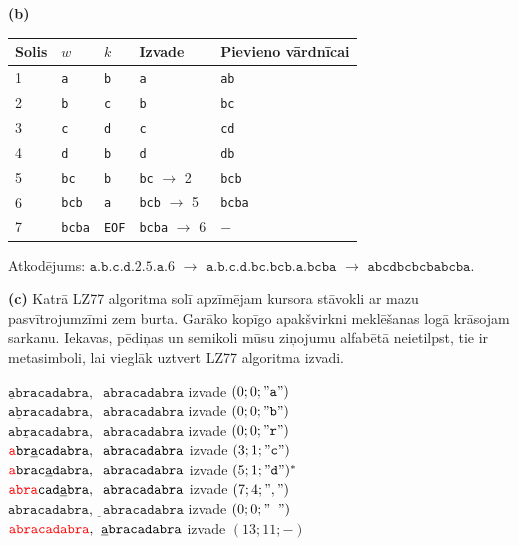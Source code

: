 \documentclass[a4paper,12pt]{article}
\begin{document}
{{\bf (b)}

\begin{center}
\begin{tabular}{ |l|l|l|l|l| } \hline
Solis & $w$ & $k$ & Izvade & Pievieno vārdnīcai \\ \hline
1 & {\tt a} & {\tt b} & {\tt a} & {\tt ab} \\
2 & {\tt b} & {\tt c} & {\tt b} & {\tt bc} \\ 
3 & {\tt c} & {\tt d} & {\tt c} & {\tt cd} \\ 
4 & {\tt d} & {\tt b} & {\tt d} & {\tt db} \\ 
5 & {\tt bc} & {\tt b} & {\tt bc} $\rightarrow$ 2 & {\tt bcb} \\ 
6 & {\tt bcb} & {\tt a} & {\tt bcb} $\rightarrow$ 5 & {\tt bcba} \\ 
7 & {\tt bcba} & {\tt EOF} & {\tt bcba} $\rightarrow$ 6 & $-$ \\ \hline
\end{tabular}
\end{center}

Atkodējums: $\mathtt{a.b.c.d.2.5.a.6}$ $\rightarrow$ $\mathtt{a.b.c.d.bc.bcb.a.bcba}$ $\rightarrow$ 
$\mathtt{abcdbcbcbabcba}$.



{\bf (c)} Katrā LZ77 algoritma solī apzīmējam kursora stāvokli ar mazu pasvītrojumzīmi zem burta.
Garāko kopīgo apakšvirkni meklēšanas logā krāsojam sarkanu.
Iekavas, pēdiņas un semikoli mūsu ziņojumu alfabētā neietilpst, tie ir metasimboli, lai 
vieglāk uztvert LZ77 algoritma izvadi.

\noindent
$\underline{\mathtt{a}}\mathtt{bracadabra,\;\;abracadabra}$ \textendash{} izvade $(0;0;\mathtt{"a"})$\\
$\mathtt{a}\underline{\mathtt{b}}\mathtt{racadabra,\;\;abracadabra}$ \textendash{} izvade $(0;0;\mathtt{"b"})$\\
$\mathtt{ab}\underline{\mathtt{r}}\mathtt{acadabra,\;\;abracadabra}$ \textendash{} izvade $(0;0;\mathtt{"r"})$\\
$\mathtt{\textcolor{red}{a}br}\underline{\mathtt{a}}\mathtt{cadabra,\;\;abracadabra}$ \textendash{} izvade $(3;1;\mathtt{"c"})$\\
$\mathtt{\textcolor{red}{a}brac}\underline{\mathtt{a}}\mathtt{dabra,\;\;abracadabra}$ \textendash{} izvade $(5;1;\mathtt{"d"})^{\ast}$\\
$\mathtt{\textcolor{red}{abra}cad}\underline{\mathtt{a}}\mathtt{bra,\;\;abracadabra}$ \textendash{} izvade $(7;4;\mathtt{","})$\\
$\mathtt{abracadabra,}\underline{\;\;}\mathtt{abracadabra}$ \textendash{} izvade $(0;0;\mathtt{"\;\;"})$\\
$\mathtt{\textcolor{red}{abracadabra},\;\;}\underline{\mathtt{a}}\mathtt{bracadabra}$ \textendash{} izvade $(13;11;-)$\\


}
\end{document}
